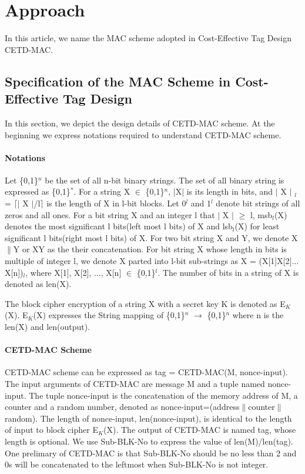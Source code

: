 \documentclass{article}
\begin{document}
\section{Approach}
In this article, we name the MAC scheme adopted in Cost-Effective Tag Design\cite{} CETD-MAC. 
\subsection{Specification of the MAC Scheme in Cost-Effective Tag Design}
In this section, we depict the design details of CETD-MAC scheme. At the beginning we express notations required to understand CETD-MAC scheme. 
\paragraph{Notations}
Let \{0,1\}$^n$ be the set of all n-bit binary strings. The set of all binary string is expressed as \{0,1\}$^*$.  
For a string X $\in$ \{0,1\}$^n$, |X| is its length in bits, and $\vert$ X $\vert$ $_l$ = $\lceil$$\vert$ X $\vert$/l$\rceil$ is the length of X in l-bit blocks.  Let 0$^l$ and 1$^l$ denote bit strings of all zeros and all ones. 
For a bit string X and an integer l that $\vert$ X $\vert$ $\geq$ l, msb$_l$(X) denotes the most significant l bits(left most l bits) of X and lsb$_l$(X) for least significant l bits(right most l bits) of X.
For two bit string X and Y, we denote X$\|$Y  or XY as the their concatenation. For bit string X whose length in bits is multiple of integer l, we denote X parted into l-bit sub-strings as X = (X[1]X[2]$\ldots$X[n])$_l$, where X[1], X[2], $\ldots$, X[n] $\in$ \{0,1\}$^l$.
The number of bits in a string of X is denoted as len(X).

The block cipher encryption of a string X with a secret key K is denoted as E$_K$(X). E$_K$(X) expresses the String mapping of \{0,1\}$^n$ $\rightarrow$ \{0,1\}$^n$ where n is the len(X) and len(output).
\paragraph{CETD-MAC Scheme}
CETD-MAC scheme can be expressed as tag = CETD-MAC(M, nonce-input). The input arguments of CETD-MAC are message M and a tuple named nonce-input. The tuple nonce-input is the concatenation of the memory address of M, a counter and a random number, denoted as nonce-input=(address$\|$counter$\|$random). The length of nonce-input, len(nonce-input), is identical to the length of input to block cipher E$_K$(X). The output of CETD-MAC is named tag, whose length is optional. We use Sub-BLK-No to express the value of  len(M)/len(tag). One prelimary of CETD-MAC is that Sub-BLK-No should be no less than 2 and 0s will be concatenated to the leftmost when Sub-BLK-No is not integer.  
\end{document}
